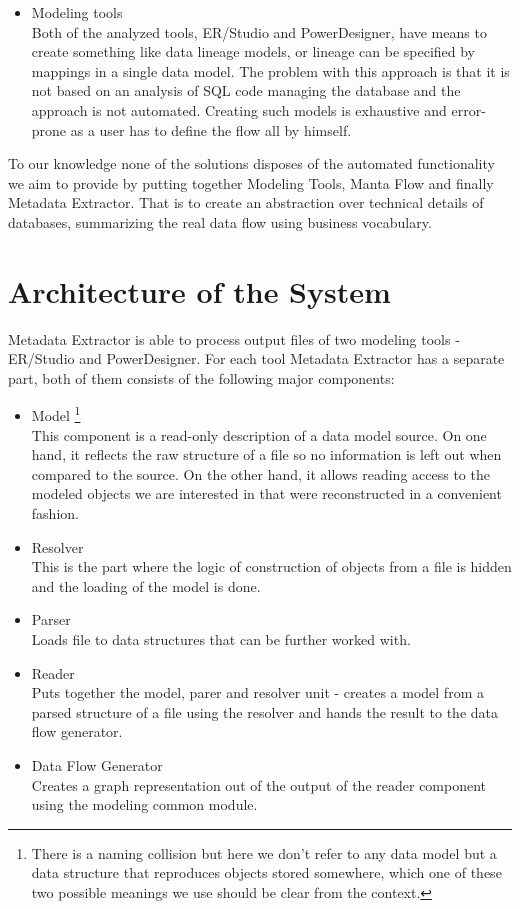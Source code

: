 \begin{itemize}
	\item Modeling tools \\
	Both of the analyzed tools, ER/Studio and PowerDesigner, have means to create something like data lineage models, or lineage can be specified by mappings in a single data model. The problem with this approach is that it is not based on an analysis of SQL code managing the database and the approach is not automated. Creating such models is exhaustive and error-prone as a user has to define the flow all by himself. 
\end{itemize}


To our knowledge none of the solutions disposes of the automated functionality we aim to provide by putting together Modeling Tools, Manta Flow and finally Metadata Extractor. That is to create an abstraction over technical details of databases, summarizing the real data flow using business vocabulary.

\section{Architecture of the System}

Metadata Extractor is able to process output files of two modeling tools - ER/Studio and PowerDesigner. For each tool Metadata Extractor has a separate part, both of them consists of the following major components:
\begin{itemize}
	\item Model \footnote{There is a naming collision but here we don't refer to any data model but a data structure that reproduces objects stored somewhere, which one of these two possible meanings we use should be clear from the context.}\\ 
	This component is a read-only description of a data model source. On one hand, it reflects the raw structure of a file so no information is left out when compared to the source. 
	On the other hand, it allows reading access to the modeled objects we are interested in that were reconstructed in a convenient fashion.
	\item Resolver \\ 
	This is the part where the logic of construction of objects from a file is hidden and the loading of the model is done. 
	\item Parser \\ 
	Loads file to data structures that can be further worked with.
	\item Reader \\
	Puts together the model, parer and resolver unit - creates a model from a parsed structure of a file using the resolver and hands the result to the data flow generator.
	\item Data Flow Generator \\ 
	Creates a graph representation out of the output of the reader component using the modeling common module.
\end{itemize}

